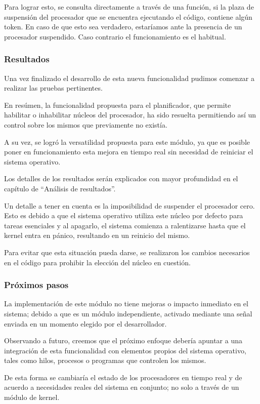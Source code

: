 Para lograr esto, se consulta directamente a través de una función, si la plaza de suspensión del procesador que se encuentra ejecutando el código, contiene algún token. En caso de que esto sea verdadero, estaríamos ante la presencia de un procesador suspendido. Caso contrario el funcionamiento es el habitual.\par


\subsubsection{Resultados}

Una vez finalizado el desarrollo de esta nueva funcionalidad pudimos comenzar a realizar las pruebas pertinentes.\par

En resúmen, la funcionalidad propuesta para el planificador, que permite habilitar o inhabilitar núcleos del procesador, ha sido resuelta permitiendo así un control sobre los mismos que previamente no existía.\par

A su vez, se logró la versatilidad propuesta para este módulo, ya que es posible poner en funcionamiento esta mejora en tiempo real sin necesidad de reiniciar el sistema operativo.\par

Los detalles de los resultados serán explicados con mayor profundidad en el capítulo de
“Análisis de resultados”.\par

Un detalle a tener en cuenta es la imposibilidad de suspender el procesador cero. Esto es debido a que el sistema operativo utiliza este núcleo por defecto para tareas esenciales y al apagarlo, el sistema comienza a ralentizarse hasta que el kernel entra en pánico, resultando en un reinicio del mismo.\par

Para evitar que esta situación pueda darse, se realizaron los cambios necesarios en el código para prohibir la elección del núcleo en cuestión.\par


\subsubsection{Próximos pasos}

La implementación de este módulo no tiene mejoras o impacto inmediato en el sistema;  debido a que es un módulo independiente, activado mediante una señal enviada en un momento elegido por el desarrollador.\par

Observando a futuro, creemos que el próximo enfoque debería apuntar a una integración de esta funcionalidad con elementos propios del sistema operativo, tales como hilos, procesos o programas que controlen los mismos.\par

De esta forma se cambiaría el estado de los procesadores en tiempo real y de acuerdo a necesidades reales del sistema en conjunto; no solo a través de un módulo de kernel.\par

\
